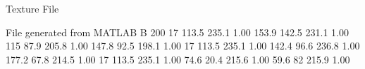 Texture File

File generated from MATLAB
B 200
   17     113.5  235.1   1.00
   153.9  142.5  231.1   1.00
   115    87.9   205.8   1.00
   147.8  92.5   198.1   1.00
   17     113.5  235.1   1.00
   142.4  96.6   236.8   1.00
   177.2  67.8   214.5   1.00
   17     113.5  235.1   1.00
   74.6   20.4   215.6   1.00
   59.6   82     215.9   1.00